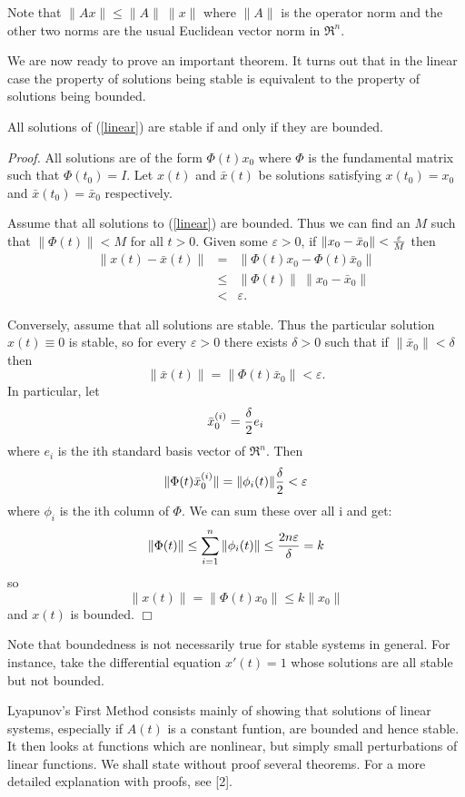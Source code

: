 \documentclass[12pt]{article}
\def\a{for every }
\def\e{there exists }
\def\pf{{\em Proof. }}
\def\eps{\varepsilon}
\def\bx{\bar{x}}
\begin{document}
Note that $\| Ax \| \le \| A \| \  \|x\|$ where $\| A \|$ is the operator
norm and the other two norms are the usual Euclidean vector norm in $\Re^n$.

We are now ready to prove an important theorem.  It turns out that in
the linear case the property of solutions being stable is equivalent
to the property of solutions being bounded.

\begin{thm}
	All solutions of (\ref{linear}) are stable if and only if they are
bounded.
\end{thm}

\pf All solutions are of the form $\Phi (t) x_0$ where $\Phi$ is the
fundamental matrix such that $\Phi (t_0) = I$.  Let $x(t)$ and
$\bx(t)$ be solutions satisfying $x(t_0) = x_0$ and $\bx(t_0) =
\bar{x}_0$ respectively.
  
Assume that all solutions to (\ref{linear}) are bounded.  Thus we can
find an $M$ such that $\| \Phi (t) \| < M$ for all $t > 0$.  Given
some $\eps > 0$, if $\| x_0 - \bx_0 \| < {\eps \over M}$ then
\begin{eqnarray*}
	\| x(t) - \bx(t) \| & = & \| \Phi (t)x_0 - \Phi (t) \bx_0 \| \\
	& \le & \| \Phi (t) \| \ \| x_0 - \bx_0 \| \\
	& < & \eps.
\end{eqnarray*}

Conversely, assume that all solutions are stable.  Thus the particular
solution $x(t) \equiv 0$ is stable, so \a $\eps > 0$ \e $\delta > 0$
such that if $\| \bx_0 \| < \delta$ then 
$$\| \bx (t) \| = \| \Phi (t) \bx_0\| < \eps.$$
In particular, let 
$$\bx_0^{(i)} = {\delta \over 2} e_i $$
where $e_i$ is the ith standard basis vector of $\Re^n$.  Then
$$\| \Phi (t) \bx_0^{(i)} \| = \| \phi_i(t) \| {\delta \over 2} <
\eps$$
where $\phi_i$ is the ith column of $\Phi$.  We can sum these over all
i and get:
$$\| \Phi (t) \| \le \sum^n_{i=1} \| \phi_i(t) \| \le {2n \eps \over
\delta} = k$$
so $$\| x(t) \| = \| \Phi (t) x_0 \| \le k \| x_0 \|$$
and $x(t)$ is bounded. $\Box$

Note that boundedness is not necessarily true for stable systems in
general.  For instance, take the differential equation $x'(t) = 1$
whose solutions are all stable but not bounded.

Lyapunov's First Method consists mainly of showing that solutions of linear
systems, especially if $A(t)$ is a constant funtion, are bounded and
hence stable.  It then looks at functions which are nonlinear, but
simply small perturbations of linear functions.  We shall state
without proof several theorems.  For a more detailed explanation with
proofs, see [2].
\end{document}
